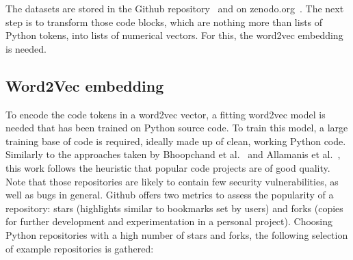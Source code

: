 \documentclass[
a4paper,
pagesize,
pdftex,
12pt,
ngerman,
fleqn,
final,
]{scrartcl}
\begin{document}
	The datasets are stored in the Github repository~\cite{Wartschinski.2.12.2019b} and on zenodo.org~\cite{Wartschinski.2.12.2019c}. 	The next step is to transform those code blocks, which are nothing more than lists of Python tokens, into lists of numerical vectors. For this, the word2vec embedding is needed. 
	
	\subsection{Word2Vec embedding}
	To encode the code tokens in a word2vec vector, a fitting word2vec model is needed that has been trained on Python source code. To train this model, a large training base of code is required, ideally made up of clean, working Python code.\\
	Similarly to the approaches taken by Bhoopchand et al.~\cite{Bhoopchand.2016} and Allamanis et al.~\cite{Allamanis.2013}, this work follows the heuristic that popular code projects are of good quality. Note that those repositories are likely to contain few security vulnerabilities, as well as bugs in general. Github offers two metrics to assess the popularity of a repository: stars (highlights similar to bookmarks set by users) and forks (copies for further development and experimentation in a personal project). Choosing Python repositories with a high number of stars and forks, the following selection of example repositories is gathered:
	
\end{document}
